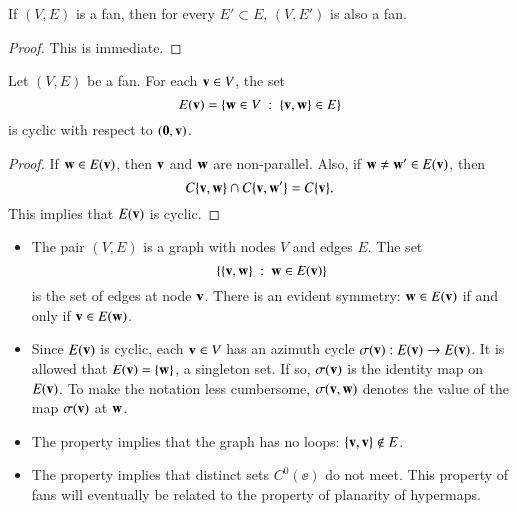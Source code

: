 \begin{lemma}\label{lemma:subset-fan}
If $(V,E)$ is a fan, then for every $E'\subset E$, $(V,E')$ is also
a fan.
\end{lemma}

\begin{proof} This is immediate.
\end{proof}

\begin{lemma}  Let $(V,E)$ be a fan.
For each ${\mathbf v}\in V$, the set
\begin{displaymath}
E({\mathbf v}) = \{{\mathbf w}\in V\ :\  \{{\mathbf v},{\mathbf w}\}\in E\}
\end{displaymath}
is cyclic with respect to $({\mathbf 0},{\mathbf v})$.
\end{lemma}
%

\begin{proof}  If ${\mathbf w}\in E({\mathbf v})$, then ${\mathbf v}$ and ${\mathbf w}$ are non-parallel.
Also, if ${\mathbf w}\ne {\mathbf w}'\in E({\mathbf v})$, then
\begin{displaymath}
C\{{\mathbf v},{\mathbf w}\}\cap C\{{\mathbf v},{\mathbf w}'\} = C\{{\mathbf v}\}.
\end{displaymath}
This implies that $E({\mathbf v})$ is cyclic.
\end{proof}

\begin{remark}
\begin{itemize}
\item The pair $(V,E)$ is a graph with nodes $V$ and edges $E$.  The set
\begin{displaymath}\{\{{\mathbf v},{\mathbf w}\}\ :\  {\mathbf w}\in E({\mathbf v})\}\end{displaymath} is
the set of edges at node ${\mathbf v}$.  There is an evident symmetry: ${\mathbf w}\in
E({\mathbf v})$ if and only if ${\mathbf v}\in E({\mathbf w})$.
%
\item
Since $E({\mathbf v})$ is cyclic,
each ${\mathbf v}\in V$ has an azimuth cycle $\sigma({\mathbf v}):E({\mathbf v})\to E({\mathbf v})$.
It is allowed that $E({\mathbf v}) = \{{\mathbf w}\}$,  a
%
singleton set. If so,
$\sigma({\mathbf v})$ is the identity map on $E({\mathbf v})$.
%
To make the notation less cumbersome, $\sigma({\mathbf v},{\mathbf w})$ denotes the
value of the map $\sigma({\mathbf v})$ at ${\mathbf w}$.
%
\item The property  implies that the graph has no
loops: $\{{\mathbf v},{\mathbf v}\}\not\in E$.
%
\item The property  implies that distinct sets
$C^0(\ee)$ do not meet.  This property of fans will eventually be
related to the property of planarity of hypermaps.
%
%
%
%
\end{itemize}
\end{remark}

